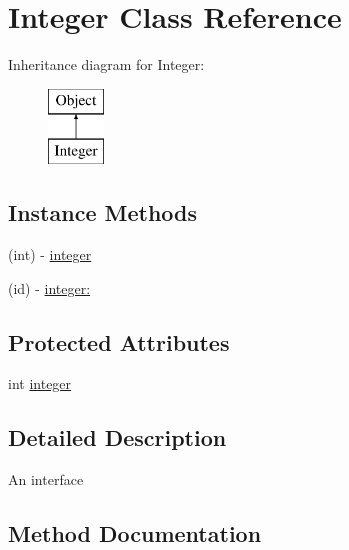 \hypertarget{interface_integer}{}\section{Integer Class Reference}
\label{interface_integer}
Inheritance diagram for Integer\+:\begin{figure}[H]
\begin{center}
\leavevmode
\includegraphics[height=2.000000cm]{interface_integer}
\end{center}
\end{figure}
\subsection*{Instance Methods}
\begin{DoxyCompactItemize}
\item 
(int) -\/ \mbox{\hyperlink{interface_integer_a7b55035e1b0e8e7d4c8587f54a760819}{integer}}
\item 
(id) -\/ \mbox{\hyperlink{interface_integer_ad2f47761103b2442ff7b3fbfe33ec6c9}{integer\+:}}
\end{DoxyCompactItemize}
\subsection*{Protected Attributes}
\begin{DoxyCompactItemize}
\item 
int \mbox{\hyperlink{interface_integer_a35e89216966d8179a1b77f14b8211fda}{integer}}
\end{DoxyCompactItemize}


\subsection{Detailed Description}
An interface 

\subsection{Method Documentation}
\mbox{\label{interface_integer_a7b55035e1b0e8e7d4c8587f54a760819}} 
